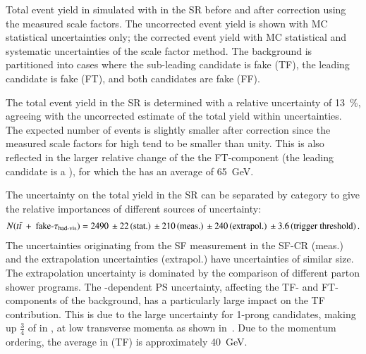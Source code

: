 \begin{table}[htbp]
  \centering

  \caption{Total event yield in simulated \ttbar with \faketauhadvis
    in the \hadhad SR before and after correction using the measured
    scale factors. The uncorrected event yield is shown with MC
    statistical uncertainties only; the corrected event yield with MC
    statistical and systematic uncertainties of the scale factor
    method. The \ttbarFakes background is partitioned into cases where
    the \pT sub-leading \tauhadvis candidate is fake (TF), the leading
    candidate is fake (FT), and both candidates are fake (FF).}%
  \label{tab:ttbarSF_yields}

  
\end{table}

The total \ttbarFakes event yield in the \hadhad SR is determined with
a relative uncertainty of \SI{13}{\percent}, agreeing with the
uncorrected estimate of the total yield within uncertainties. The
expected number of \ttbarFakes events is slightly smaller after
correction since the measured scale factors for high \pT
\faketauhadvis tend to be smaller than unity. This is also reflected
in the larger relative change of the the FT-component (the leading
\tauhadvis candidate is a \faketauhadvis), for which the
\faketauhadvis has an average \pT of \SI{65}{\GeV}.

The uncertainty on the total \ttbarFakes yield in the \hadhad SR can
be separated by category to give the relative importances of different
sources of uncertainty:
\begin{align*}
  N(\ttbarFakes) = \num{2490}
  \valuesep\numerrt{22}{stat.}%
  \valuesep\numerrt{210}{meas.}%
  \valuesep\numerrt{240}{extrapol.}%
  \valuesep\numerrt{3.6}{trigger threshold} \,\text{.}
\end{align*}
The uncertainties originating from the SF measurement in the SF-CR
(meas.) and the extrapolation uncertainties (extrapol.) have
uncertainties of similar size. The extrapolation uncertainty is
dominated by the comparison of different parton shower programs. The
\faketauhadvis \pT-dependent PS uncertainty, affecting the TF- and
FT-components of the background, has a particularly large impact on
the TF contribution. This is due to the large uncertainty for 1-prong
\faketauhadvis candidates, making up $\frac{3}{4}$ of \faketauhadvis
in \ttbar, at low transverse momenta as shown
in~. Due to the momentum ordering,
the average \faketauhadvis \pT in \ttbarFakes (TF) is approximately
\SI{40}{\GeV}.

